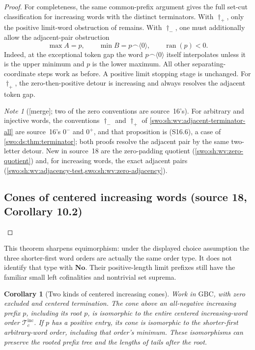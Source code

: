 \documentclass[11pt]{article}
\newtheorem{corollary}[corollary]{Corollary}
\theoremstyle{definition}
\theoremstyle{remark}
\newtheorem{note}[note]{Note}
\newcommand{\No}{\mathbf{No}}
\newcommand{\merge}{\textsf{[merge]}}
\newcommand{\WordsInc}{\mathcal T^{\mathrm{inc}}}
\begin{document}
\begin{proof}
For completeness, the same common-prefix argument gives the full
set-cut classification for increasing words with the distinct
terminators.  With \(\dagger_+\), only the positive limit-word
obstruction of  remains.  With
\(\dagger_-\), one must additionally allow the adjacent-pair
obstruction
\[
 \max A=p,\qquad \min B=p\mathbin{\frown}\langle0\rangle,
 \qquad \operatorname{ran}(p)<0.
\]
Indeed, at the exceptional token gap the word
\(p\mathbin{\frown}\langle0\rangle\) itself interpolates unless
it is the upper minimum and \(p\) is the lower maximum.  All
other separating-coordinate steps work as before.  A positive
limit stopping stage is unchanged.  For \(\dagger_+\), the
zero-then-positive detour is increasing and always resolves the
adjacent token gap.

\begin{note}[\merge; two of the zero conventions are source~16's]\label{swo:vii:note:adjacent}
For arbitrary and injective words, the conventions $\dagger_-$ and $\dagger_+$
of \cref{swo:sh:wv:adjacent-terminator-all} are source~16's $0^-$ and $0^+$,
and that proposition is (S16.6), a case of \cref{swo:ds:thm:terminator}; both
proofs resolve the adjacent pair by the same two-letter detour. New in
source~18 are the zero-padding quotient (\cref{swo:sh:wv:zero-quotient}) and,
for increasing words, the exact adjacent pairs
(\cref{swo:sh:wv:adjacency-test,swo:sh:wv:zero-adjacency}).
\end{note}

\subsection{Cones of centered increasing words (source 18, Corollary 10.2)}

\end{proof}

This theorem sharpens equimorphism: under the displayed choice
assumption the three shorter-first word orders are actually the
same order type.  It does not identify that type with \(\No\).
Their positive-length limit prefixes still have the familiar
small left cofinalities and nontrivial set suprema.

\begin{corollary}[Two kinds of centered increasing cones]
\label{swo:sh:wv:cone-types}
Work in \(\mathrm{GBC}\), with zero excluded and centered termination.
The cone above an all-negative increasing prefix \(p\), including
its root \(p\), is isomorphic to the entire centered increasing-word
order \(\WordsInc_c\).  If \(p\) has a positive entry,
its cone is isomorphic to the shorter-first arbitrary-word order,
including that order's minimum.  These isomorphisms can preserve
the rooted prefix tree and the lengths of tails after the root.
\end{corollary}
\end{document}
